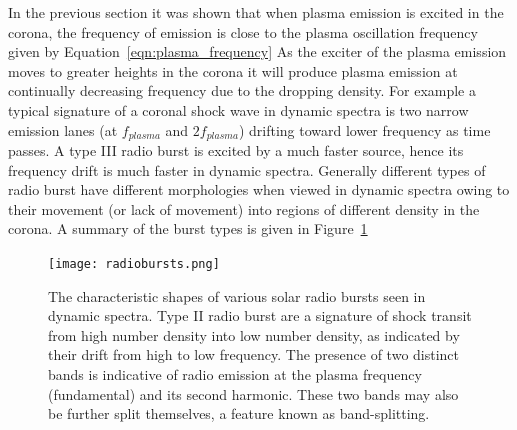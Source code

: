 In the previous section it was shown that when plasma emission is excited in the corona, the frequency of emission is close to the plasma oscillation frequency given by Equation~\ref{eqn:plasma_frequency}
As the exciter of the plasma emission moves to greater heights in the corona it will produce plasma emission at continually decreasing frequency due to the dropping density. For example a typical signature of a coronal shock wave in dynamic spectra is two narrow emission lanes (at $f_{plasma}$ and $2f_{plasma}$) drifting toward lower frequency as time passes. A type III radio burst is excited by a much faster source, hence its frequency drift is much faster in dynamic spectra. Generally different types of radio burst have different morphologies when viewed in dynamic spectra owing to their movement (or lack of movement) into regions of different density in the corona. A summary of the burst types is given in Figure~\ref{fig:radiobursts}
\begin{figure}[t!]
\begin{center}
\texttt{[image: radiobursts.png]}
\caption[Solar radio burst morphologies]{The characteristic shapes of various solar radio bursts seen in dynamic spectra. Type II radio burst are a signature of shock transit from high number density into low number density, as indicated by their drift from high to low frequency. The presence of two distinct bands is indicative of radio emission at the plasma frequency (fundamental) and its second harmonic. These two bands may also be further split themselves, a feature known as band-splitting.}
\label{fig:radiobursts}
\end{center}
\end{figure}

